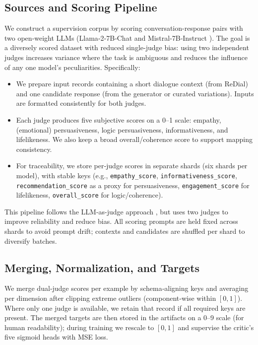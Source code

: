 \documentclass[12pt]{article}
\begin{document}
  \subsection{Sources and Scoring Pipeline}
  We construct a supervision corpus by scoring conversation-response pairs with two open‑weight LLMs (Llama‑2‑7B‑Chat \citep{meta2023llama2} and Mistral‑7B‑Instruct \citep{mistral2023}). The goal is a diversely scored dataset with reduced single-judge bias: using two independent judges increases variance where the task is ambiguous and reduces the influence of any one model's peculiarities.
  \newline
  \newline
  Specifically:
  \begin{itemize}[leftmargin=*]
    \item We prepare input records containing a short dialogue context (from ReDial) and one candidate response (from the generator or curated variations). Inputs are formatted consistently for both judges.
    \item Each judge produces five subjective scores on a 0–1 scale: empathy, (emotional) persuasiveness, logic persuasiveness, informativeness, and lifelikeness. We also keep a broad overall/coherence score to support mapping consistency.
    \item For traceability, we store per‑judge scores in separate shards (six shards per model), with stable keys (e.g., \texttt{empathy\_score}, \texttt{informativeness\_score}, \texttt{recommendation\_score} as a proxy for persuasiveness, \texttt{engagement\_score} for lifelikeness, \texttt{overall\_score} for logic/coherence).
  \end{itemize}
  This pipeline follows the LLM-as-judge approach \citep{yan2023llmjudge}, but uses two judges to improve reliability and reduce bias. All scoring prompts are held fixed across shards to avoid prompt drift; contexts and candidates are shuffled per shard to diversify batches.
  
  \subsection{Merging, Normalization, and Targets}
  We merge dual‑judge scores per example by schema‑aligning keys and averaging per dimension after clipping extreme outliers (component‑wise within \([0,1]\)). Where only one judge is available, we retain that record if all required keys are present. The merged targets are then stored in the artifacts on a 0–9 scale (for human readability); during training we rescale to \([0,1]\) and supervise the critic's five sigmoid heads with MSE loss.
  
\end{document}
